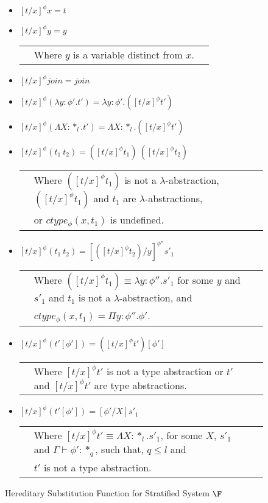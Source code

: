 \begin{figure}[t]
  \small
  \begin{itemize}
  \item[] $[t/x]^\phi x = t$

  \item[] $[t/x]^\phi y = y$\\
    \begin{tabular}{lll}
      & Where $y$ is a variable distinct from $x$.\\
    \end{tabular}

  \item[] $[t/x]^\phi join = join$

  \item[] $[t/x]^\phi (\lambda y:\phi'.t') = \lambda y:\phi'.([t/x]^\phi t')$

  \item[] $[t/x]^\phi (\Lambda X:*_l.t') = \Lambda X:*_l.([t/x]^\phi t')$

  \item[] $[t/x]^\phi (t_1\ t_2) = ([t/x]^\phi t_1)\ ([t/x]^\phi t_2)$\\
    \begin{tabular}{lll}
      & Where $([t/x]^\phi t_1)$ is not a $\lambda$-abstraction, 
      $([t/x]^\phi t_1)$ and $t_1$ are $\lambda$-abstractions,\\ 
      & or $ctype_\phi(x,t_1)$ is undefined.
    \end{tabular}

  \item[] $[t/x]^{\phi} (t_1\ t_2) = [([t/x]^{\phi} t_2)/y]^{\phi''} s'_1$\\
    \begin{tabular}{lll}
      & Where $([t/x]^{\phi} t_1) \equiv \lambda y:\phi''.s'_1$ 
        for some $y$ and $s'_1$ and $t_1$ is not a $\lambda$-abstraction, and \\
      & $ctype_\phi(x,t_1) = \Pi y:\phi''.\phi'$.\\
    \end{tabular}

  \item[] $[t/x]^\phi (t'[\phi']) = ([t/x]^\phi t')[\phi']$\\
    \begin{tabular}{lll}
      & Where $[t/x]^\phi t'$ is not a type abstraction or
      $t'$ and $[t/x]^\phi t'$ are type abstractions.
    \end{tabular}

    \item[] $[t/x]^{\phi} (t'[\phi']) = [\phi'/X]s'_1$\\
      \begin{tabular}{lll}
        & Where $[t/x]^{\phi} t' \equiv \Lambda X:*_l.s'_1$,
        for some $X$, $s'_1$ and $\Gamma \vdash \phi':*_q$, such that, $q \leq l$ and\\
	& $t'$ is not a type abstraction.
      \end{tabular}
  \end{itemize}
  \caption{Hereditary Substitution Function for Stratified System $\F$}
  \label{fig:hereditary_substitution_function_ssfe}
\end{figure}
